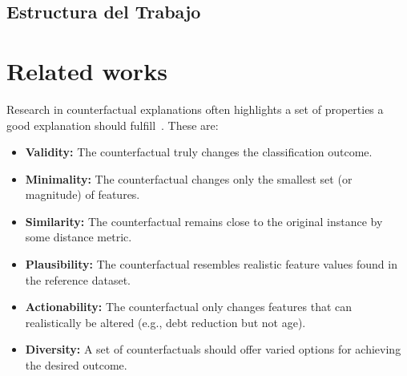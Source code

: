 \documentclass[12pt]{extarticle}
\numberwithin{equation}{section}
\begin{document}
\subsection{Estructura del Trabajo} %

\section{Related works}
Research in counterfactual explanations often highlights a set of properties a good explanation should fulfill~\cite{guidotti2024counterfactual}. These are:
\begin{itemize}
  \item \textbf{Validity:} The counterfactual truly changes the classification outcome.
  \item \textbf{Minimality:} The counterfactual changes only the smallest set (or magnitude) of features.
  \item \textbf{Similarity:} The counterfactual remains close to the original instance by some distance metric.
  \item \textbf{Plausibility:} The counterfactual resembles realistic feature values found in the reference dataset.
  \item \textbf{Actionability:} The counterfactual only changes features that can realistically be altered (e.g., debt reduction but not age).
  \item \textbf{Diversity:} A set of counterfactuals should offer varied options for achieving the desired outcome.
\end{itemize}
\end{document}
